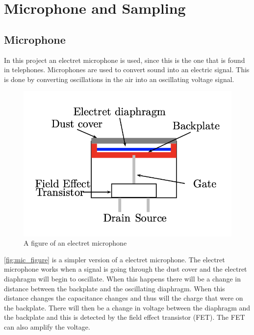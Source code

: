 \chapter{Microphone and Sampling}

\section{Microphone}
In this project an electret microphone is used, since this is the one that is found in telephones. 
Microphones are used to convert sound into an electric signal. This is done by converting oscillations in the air into an oscillating voltage signal. 

\begin{figure}[H]
    \centering
    \includegraphics[scale=0.65]{figures/Microphone_figure.png}
    \caption{A figure of an electret microphone \cite[p. 160]{LectureNotes}}
    \label{fig:mic_figure}
\end{figure}

\autoref{fig:mic_figure} is a simpler version of a electret microphone. The electret microphone works when a signal is going through the dust cover and the electret diaphragm will begin to oscillate. When this happens there will be a change in distance between the backplate and the oscillating diaphragm. When this distance changes the capacitance changes and thus will the charge that were on the backplate. There will then be a change in voltage between the diaphragm and the backplate and this is detected by the field effect transistor (FET). The FET can also amplify the voltage. \\

